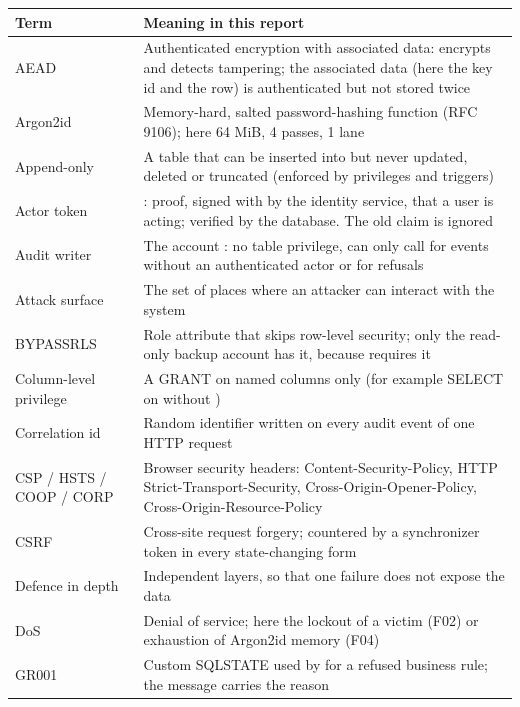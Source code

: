 \begin{center}\small
\begin{longtable}{@{}L{3.2cm}L{12.6cm}@{}}
\toprule\textbf{Term} & \textbf{Meaning in this report}\\\midrule\endhead
AEAD & Authenticated encryption with associated data: encrypts and detects tampering; the associated data (here the key id and the row) is authenticated but not stored twice\\
Argon2id & Memory-hard, salted password-hashing function (RFC 9106); here 64 MiB, 4 passes, 1 lane\\
Append-only & A table that can be inserted into but never updated, deleted or truncated (enforced by privileges and triggers)\\
Actor token & : proof, signed with  by the identity service, that a user is acting; verified by the database. The old  claim is ignored\\
Audit writer & The account : no table privilege, can only call  for events without an authenticated actor or for refusals\\
Attack surface & The set of places where an attacker can interact with the system\\
BYPASSRLS & Role attribute that skips row-level security; only the read-only backup account has it, because  requires it\\
Column-level privilege & A GRANT on named columns only (for example SELECT on  without )\\
Correlation id & Random identifier written on every audit event of one HTTP request\\
CSP / HSTS / COOP / CORP & Browser security headers: Content-Security-Policy, HTTP Strict-Transport-Security, Cross-Origin-Opener-Policy, Cross-Origin-Resource-Policy\\
CSRF & Cross-site request forgery; countered by a synchronizer token in every state-changing form\\
Defence in depth & Independent layers, so that one failure does not expose the data\\
DoS & Denial of service; here the lockout of a victim (F02) or exhaustion of Argon2id memory (F04)\\
GR001 & Custom SQLSTATE used by  for a refused business rule; the message carries the reason\\

\end{longtable}
\end{center}
